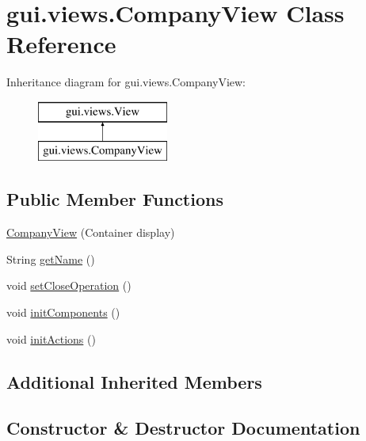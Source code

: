 \hypertarget{classgui_1_1views_1_1_company_view}{}\section{gui.\+views.\+Company\+View Class Reference}
\label{classgui_1_1views_1_1_company_view}
Inheritance diagram for gui.\+views.\+Company\+View\+:\begin{figure}[H]
\begin{center}
\leavevmode
\includegraphics[height=2.000000cm]{classgui_1_1views_1_1_company_view}
\end{center}
\end{figure}
\subsection*{Public Member Functions}
\begin{DoxyCompactItemize}
\item 
\mbox{\hyperlink{classgui_1_1views_1_1_company_view_aa2a8ea9f17a43e5b24d54751833531b7}{Company\+View}} (Container display)
\item 
String \mbox{\hyperlink{classgui_1_1views_1_1_company_view_affe08c7aa7dfc02d86a18771aa2eb217}{get\+Name}} ()
\item 
void \mbox{\hyperlink{classgui_1_1views_1_1_company_view_abc80fd483dd89c441dbbe6a93ec7b213}{set\+Close\+Operation}} ()
\item 
void \mbox{\hyperlink{classgui_1_1views_1_1_company_view_a9a68d5e202ac887657159416dadb6887}{init\+Components}} ()
\item 
void \mbox{\hyperlink{classgui_1_1views_1_1_company_view_ab446dccf76b0195e7f09b9cd0e6d72a0}{init\+Actions}} ()
\end{DoxyCompactItemize}
\subsection*{Additional Inherited Members}


\subsection{Constructor \& Destructor Documentation}
\mbox{\label{classgui_1_1views_1_1_company_view_aa2a8ea9f17a43e5b24d54751833531b7}} 
